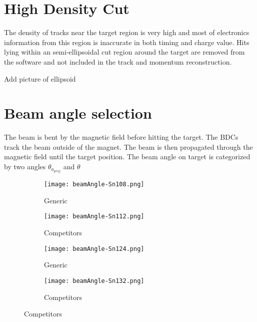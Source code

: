 \section{High Density Cut}
The density of tracks near the target region is very high and most of electronics information from this region is inaccurate in both timing and charge value. Hits lying within an semi-ellipsoidal cut region around the target are removed from the software and not included in the track and momentum reconstruction. 

Add picture of ellipsoid 

\section{Beam angle selection}
The beam is bent by the magnetic field before hitting the target. The BDCs track the beam outside of the magnet. The beam is then propagated through the magnetic field until the target position. The beam angle on target is categorized by two angles $\theta_{a_{proj}}$ and $\theta$

\begin{figure}[!htb]
    \centering
    \begin{subfigure}[t]{0.45\textwidth}
        \centering
        \texttt{[image: beamAngle-Sn108.png]} 
        \caption{Generic} \label{fig:mom_S_before}
    \end{subfigure}
    \hfill
    \begin{subfigure}[t]{0.45\textwidth}
        \centering
        \texttt{[image: beamAngle-Sn112.png]} 
        \caption{Competitors} \label{fig:mom_L_before}
    \end{subfigure}
    
    \begin{subfigure}[t]{0.45\textwidth}
        \centering
        \texttt{[image: beamAngle-Sn124.png]} 
        \caption{Generic} \label{fig:mom_S_after}
    \end{subfigure}
    \hfill
    \begin{subfigure}[t]{0.45\textwidth}
        \centering
        \texttt{[image: beamAngle-Sn132.png]} 
        \caption{Competitors} \label{fig:mom_L_after}
    \end{subfigure}
\label{fig:mom_sc}
\end{figure}



